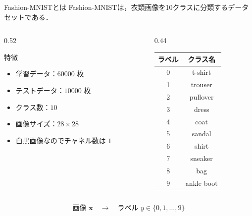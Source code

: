 \documentclass[dvipdfmx,uplatex,11pt]{beamer}
\newcommand{\key}[1]{\alert{#1}}
\begin{document}
\begin{frame}{Fashion-MNISTとは}
\key{Fashion-MNIST}は，衣類画像を10クラスに分類するデータセットである．

\vspace{-1.5em}
\begin{columns}[T,totalwidth=\textwidth]
\begin{column}{0.52\textwidth}
\begin{d2lbox}{特徴}
\begin{itemize}
  \item 学習データ：$60000$ 枚
  \item テストデータ：$10000$ 枚
  \item クラス数：$10$
  \item 画像サイズ：$28 \times 28$
  \item 白黒画像なのでチャネル数は $1$
\end{itemize}
\end{d2lbox}
\end{column}
\begin{column}{0.44\textwidth}
\begin{d2lplainbox}
\small
\begin{center}
\begin{tabular}{c|c}
ラベル & クラス名 \\ \hline
0 & t-shirt \\
1 & trouser \\
2 & pullover \\
3 & dress \\
4 & coat \\
5 & sandal \\
6 & shirt \\
7 & sneaker \\
8 & bag \\
9 & ankle boot
\end{tabular}
\end{center}
\end{d2lplainbox}
\end{column}
\end{columns}
\[
\text{画像 } \bm{x}
\quad \longrightarrow \quad
\text{ラベル } y \in \{0,1,\dots,9\}
\]
\end{frame}
\end{document}
